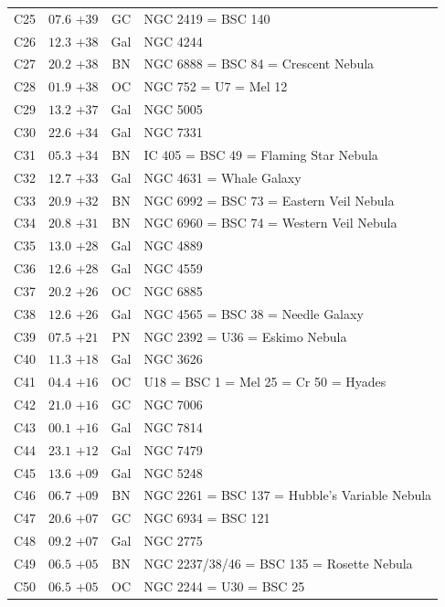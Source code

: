 \begin{table}[t]
\begin{tabularx}{\linewidth}{lccX}
C25  &$07.6$ $+39$&GC &NGC 2419 = BSC 140\\
C26  &$12.3$ $+38$&Gal&NGC 4244\\
C27  &$20.2$ $+38$&BN &NGC 6888 = BSC 84 = Crescent Nebula\\
C28  &$01.9$ $+38$&OC &NGC 752 = U7 = Mel 12\\
C29  &$13.2$ $+37$&Gal&NGC 5005\\
C30  &$22.6$ $+34$&Gal&NGC 7331\\
C31  &$05.3$ $+34$&BN &IC 405 = BSC 49 = Flaming Star Nebula\\
C32  &$12.7$ $+33$&Gal&NGC 4631 = Whale Galaxy\\
C33  &$20.9$ $+32$&BN &NGC 6992 = BSC 73 = Eastern Veil Nebula\\
C34  &$20.8$ $+31$&BN &NGC 6960 = BSC 74 = Western Veil Nebula\\
C35  &$13.0$ $+28$&Gal&NGC 4889\\
C36  &$12.6$ $+28$&Gal&NGC 4559\\
C37  &$20.2$ $+26$&OC &NGC 6885\\
C38  &$12.6$ $+26$&Gal&NGC 4565 = BSC 38 = Needle Galaxy\\
C39  &$07.5$ $+21$&PN &NGC 2392 = U36 = Eskimo Nebula\\
C40  &$11.3$ $+18$&Gal&NGC 3626\\
C41  &$04.4$ $+16$&OC &U18 = BSC 1 = Mel 25 = Cr 50 = Hyades\\
C42  &$21.0$ $+16$&GC &NGC 7006\\
C43  &$00.1$ $+16$&Gal&NGC 7814\\
C44  &$23.1$ $+12$&Gal&NGC 7479\\
C45  &$13.6$ $+09$&Gal&NGC 5248\\
C46  &$06.7$ $+09$&BN &NGC 2261 = BSC 137 = Hubble's Variable Nebula\\
C47  &$20.6$ $+07$&GC &NGC 6934 = BSC 121\\
C48  &$09.2$ $+07$&Gal&NGC 2775\\
C49  &$06.5$ $+05$&BN &NGC 2237/38/46 = BSC 135 = Rosette Nebula\\
C50  &$06.5$ $+05$&OC &NGC 2244 = U30 = BSC 25\\

        \hline
    \end{tabularx}
\end{table}
\clearpage


